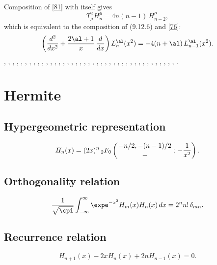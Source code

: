 \documentclass[envcountchap,graybox]{svmono}
\newcommand{\hyp}[5]{\mbox{}_{#1}{F}_{#2}
\left(\genfrac{}{}{0pt}{}{#3}{#4}\,;\,#5\right)}
\begin{document}
Composition of \eqref{81} with itself gives
\[
T_\mu^2 H_n^\mu=4n(n-1)\,H_{n-2}^\mu,
\]
which is equivalent to the composition of (9.12.6) and \eqref{76}:
\begin{equation}
\left(\frac{d^2}{dx^2}+\frac{2\al+1}x\,\frac d{dx}\right)L_n^\al(x^2)
=-4(n+\al)\,L_{n-1}^\al(x^2).
\label{82}
\end{equation}
%
\cite{Allaway76}, \cite{NAlSalam66}, \cite{AlSalam90}, \cite{AlSalamChihara76},
\cite{AlSalamIsmail76}, \cite{AndrewsAskey85}, \cite{Area+II}, \cite{Askey75},
\cite{AskeyGasper77}, \cite{AskeyWilson85}, \cite{AtakRahmanSuslov}, \cite{Bavinck98},
\cite{BavinckKoekoek}, \cite{Chihara78}, \cite{Chihara79}, \cite{Dunkl76}, \cite{Erdelyi+},
\cite{Gasper73I}, \cite{Gasper74}, \cite{Goh}, \cite{HoareRahman}, \cite{IsmailLetVal88},
\cite{Koekoek2000}, \cite{Koorn88}, \cite{Krasikov2002}, \cite{LabelleYehI},
\cite{LabelleYehII}, \cite{LabelleYehIII}, \cite{Lesky62}, \cite{Lesky89}, \cite{Lesky94I},
\cite{Lesky95II}, \cite{LewanowiczII}, \cite{LopezTemme2004}, \cite{Meixner}, \cite{Nikiforov+},
\cite{NikiforovUvarov}, \cite{Szafraniec}, \cite{Szego75}, \cite{Viennot}, \cite{Zarzo+},
\cite{Zeng90}.


\section{Hermite}

\par\setcounter{equation}{0}

\subsection*{Hypergeometric representation}
\begin{equation}
\label{DefHermite}
H_n(x)=(2x)^n\,\hyp{2}{0}{-n/2,-(n-1)/2}{-}{-\frac{1}{x^2}}.
\end{equation}

\subsection*{Orthogonality relation}
\begin{equation}
\label{OrtHermite}
\frac{1}{\sqrt{\cpi}}\int_{-\infty}^{\infty}\expe^{-x^2}H_m(x)H_n(x)\,dx
=2^nn!\,\delta_{mn}.
\end{equation}

\subsection*{Recurrence relation}
\begin{equation}
\label{RecHermite}
H_{n+1}(x)-2xH_n(x)+2nH_{n-1}(x)=0.
\end{equation}
\end{document}
